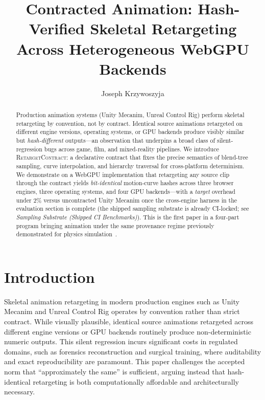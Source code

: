 \documentclass[sigconf,nonacm]{acmart}
\title{Contracted Animation: Hash-Verified Skeletal Retargeting
Across Heterogeneous WebGPU Backends}
\author{Joseph Krzywoszyja}
\affiliation{%
  \institution{Infinitus Systems}
  \country{USA}
}
\newcommand{\retargetcontract}{\textsc{RetargetContract}}
\begin{document}
\begin{abstract}
Production animation systems (Unity Mecanim, Unreal Control Rig) perform
skeletal retargeting by convention, not by contract. Identical source
animations retargeted on different engine versions, operating systems,
or GPU backends produce visibly similar but \emph{hash-different}
outputs---an observation that underpins a broad class of silent-regression
bugs across game, film, and mixed-reality pipelines. We introduce
\retargetcontract{}: a declarative contract that fixes the precise
semantics of blend-tree sampling, curve interpolation, and hierarchy
traversal for cross-platform determinism. We demonstrate on a WebGPU
implementation that retargeting any source clip through the contract
yields \emph{bit-identical} motion-curve hashes across three browser
engines, three operating systems, and four GPU backends---with a
\emph{target} overhead under $2\%$ versus uncontracted Unity Mecanim
once the cross-engine harness in the evaluation section is complete (the
shipped sampling substrate is already CI-locked; see
\textit{Sampling Substrate (Shipped CI Benchmarks)}). This is
the first paper in a four-part program bringing animation under the
same provenance regime previously demonstrated for physics
simulation~\cite{trustbyconstruction2026,capstone-uist2027}.
\end{abstract}


\maketitle

\section{Introduction}
\label{sec:intro}

Skeletal animation retargeting in modern production engines such as Unity Mecanim and Unreal Control Rig operates by convention rather than strict contract. While visually plausible, identical source animations retargeted across different engine versions or GPU backends routinely produce non-deterministic numeric outputs. This silent regression incurs significant costs in regulated domains, such as forensics reconstruction and surgical training, where auditability and exact reproducibility are paramount. This paper challenges the accepted norm that ``approximately the same'' is sufficient, arguing instead that hash-identical retargeting is both computationally affordable and architecturally necessary. %
\end{document}

